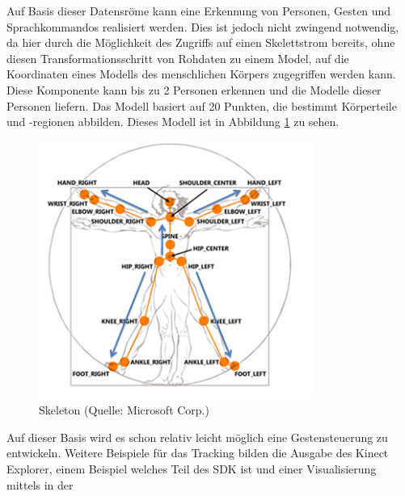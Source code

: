 \par\smallskip 
Auf Basis dieser Datensr\"ome kann eine Erkennung von Personen, Gesten und Sprachkommandos realisiert werden.
Dies ist jedoch nicht zwingend notwendig, da hier durch die M\"oglichkeit des Zugriffs auf einen Skelettstrom bereits, 
ohne diesen Transformationsschritt von Rohdaten zu einem Model, auf die Koordinaten eines Modells des menschlichen K\"orpers 
zugegriffen werden kann. Diese Komponente kann bis zu 2 Personen erkennen und die Modelle dieser Personen liefern\footnotemark[3].
Das Modell basiert auf 20 Punkten, die bestimmt K\"orperteile und -regionen abbilden. Dieses Modell ist in Abbildung \ref{fig:skeleton} zu sehen.
\par\smallskip 
\begin{figure}[htb]
\centering
\includegraphics[width=0.8\textwidth]{img/04kapitel/skeleton.png}
\caption[Skeleton]{Skeleton (Quelle: Microsoft Corp.\footnotemark[3])}
\label{fig:skeleton}
\end{figure}
\newpage
Auf dieser Basis wird es schon relativ leicht m\"oglich eine Gestensteuerung zu entwickeln. Weitere Beispiele f\"ur das Tracking bilden die 
Ausgabe des Kinect Explorer\footnotemark[4], einem Beispiel welches Teil des SDK ist und einer Visualisierung mittels  in der 
